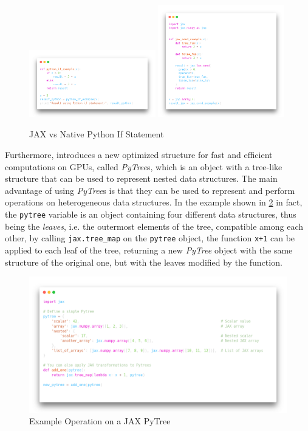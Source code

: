\begin{figure}[h]
    \centering
    \caption{JAX vs Native Python If Statement}
    \label{fig:jax_python_if}
    \includegraphics[width=0.49\textwidth]{Images/python_if.png}
    \includegraphics[width=0.49\textwidth]{Images/jax_if.png}
\end{figure}

Furthermore, \jax introduces a new optimized structure for fast and efficient computations on \ac{GPU}s, called \textit{PyTree}s, which is an object with a tree-like structure that can be used to represent nested data structures. The main advantage of using \textit{PyTree}s is that they can be used to represent and perform operations on heterogeneous data structures. In the example shown in \cref{fig:pytree_example} in fact, the \texttt{pytree} variable is an object containing four different data structures, thus being the \textit{leaves}, i.e. the outermost elements of the tree, compatible among each other, by calling \texttt{jax.tree\_map} on the \texttt{pytree} object, the function \texttt{x+1} can be applied to each leaf of the tree, returning a new \textit{PyTree} object with the same structure of the original one, but with the leaves modified by the function.

\begin{figure}[h]
    \centering
    \caption{Example Operation on a JAX PyTree}
    \label{fig:pytree_example}
    \includegraphics[width=\textwidth]{Images/pytree_example.png}
\end{figure}

